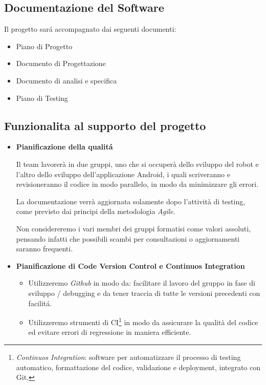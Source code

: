 \documentclass{article}
\begin{document}
  \subsection{Documentazione del Software}
  
  Il progetto sará accompagnato dai seguenti documenti:
  
  \begin{itemize}
  \item
    Piano di Progetto
  \item
    Documento di Progettazione
  \item
    Documento di analisi e specifica
  \item
    Piano di Testing
  \end{itemize}
  
  \subsection{Funzionalita al supporto del
  progetto}
  
  \begin{itemize}
  \item
    \textbf{Pianificazione della qualitá}
  
     Il team lavorerà in due gruppi, uno che si occuperà dello sviluppo del robot e l'altro dello sviluppo dell'applicazione Android, i quali scriveranno e revisioneranno il codice in modo parallelo, in modo da minimizzare gli errori.

La documentazione verrà aggiornata solamente dopo l'attività di testing, come previsto dai principi della metodologia \textit{Agile}.

   Non considereremo i vari membri dei gruppi formatisi come valori assoluti, pensando infatti che possibili scambi per consultazioni o aggiornamenti saranno frequenti.
  \item
    \textbf{Pianificazione di Code Version Control e Continuos
    Integration}
  
    \begin{itemize}
    \item
      Utilizzeremo \emph{Github} in modo da: facilitare il lavoro del
      gruppo in fase di sviluppo / debugging e da tener traccia di tutte
      le versioni precedenti con facilitá.
    \item
      Utilizzeremo strumenti di CI\footnote{\emph{Continuos Integration}:
        software per automatizzare il processo di testing automatico,
        formattazione del codice, validazione e deployment, integrato con
        Git.} in modo da assicurare la qualità del codice ed evitare
      errori di regressione in maniera efficiente.
    \end{itemize}
  \end{itemize}
  
\end{document}
